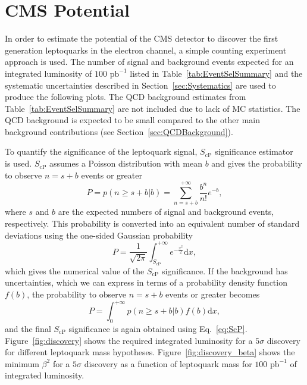 %

\section{CMS Potential} \label{CMSpotential}

In order to estimate the potential of the CMS detector to discover the first generation leptoquarks
in the electron channel, a simple counting experiment approach is used. 
The number of signal and background events expected for an integrated luminosity of
$100\text{ pb}^{-1}$ listed in Table~\ref{tab:EventSelSummary} and the systematic uncertainties described 
in Section~\ref{sec:Systematics} are used to produce the following plots. 
The QCD background estimates from Table~\ref{tab:EventSelSummary} 
are not included due to lack of MC statistics. The QCD background is expected to be 
small compared to the other main background contributions (see Section~\ref{sec:QCDBackground}).

To quantify the significance of the
leptoquark signal, $S_\text{cP}$ significance estimator~\cite{ref:scp} is used. $S_\text{cP}$ assumes a Poisson distribution
with mean $b$ and gives the probability to observe $n=s+b$ events or greater
\begin{equation}
P = p(n\geq s+b|b) = \sum_{n=s+b}^{+\infty} \frac{b^n}{n!}e^{-b},
\end{equation}
where $s$ and $b$ are the expected numbers of signal and background events, respectively. This probability is 
converted into an equivalent number of standard deviations using the one-sided Gaussian probability
\begin{equation}
P = \frac{1}{\sqrt{2\pi}}\int_{S_\text{cP}}^{+\infty} e^{-\frac{x^2}{2}}\mathrm{d}x,
\label{eq:ScP}
\end{equation}
which gives the numerical value of the $S_\text{cP}$ significance. If the background has uncertainties, which we can express in terms of
a probability density function $f(b)$, the probability to observe $n=s+b$ events or greater becomes
\begin{equation}
P = \int_0^{+\infty} p(n\geq s+b|b)f(b)\mathrm{d}x,
\end{equation}
and the final $S_\text{cP}$ significance is again obtained using Eq.~\ref{eq:ScP}. Figure~\ref{fig:discovery} shows the required integrated luminosity
for a $5\sigma$ discovery for different leptoquark mass hypotheses. Figure~\ref{fig:discovery_beta} shows the minimum $\beta^2$ for
a $5\sigma$ discovery as a function of leptoquark mass for $100\text{ pb}^{-1}$ of integrated luminosity.

